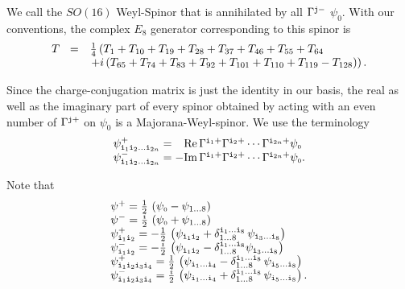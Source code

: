 \documentclass[a4paper,12pt]{article}
\begin{document}
We call the $SO(16)$ Weyl-Spinor that is annihilated by all
$\Gamma^{{\tt j}-}$ $\psi_{\scriptscriptstyle 0}$. With our conventions, the complex
$E_8$ generator corresponding to this spinor is
\begin{equation}
\begin{array}{lcl}
T_{\scriptscriptstyle}&=&\frac{1}{4}\left(T_{1}+T_{10}+T_{19}+T_{28}+T_{37}+T_{46}+T_{55}+T_{64}\right.\\
&&\left.+i\left(T_{65}+T_{74}+T_{83}+T_{92}+T_{101}+T_{110}+T_{119}-T_{128}\right)\right).
\end{array}
\end{equation}


Since the charge-conjugation matrix is just the identity in our basis,
the real as well as the imaginary part of every spinor obtained by
acting with an even number of $\Gamma^{{\tt j}+}$ on
$\psi_{\scriptscriptstyle 0}$ is a Majorana-Weyl-spinor.
We use the terminology
\begin{equation}
\begin{array}{l}
\psip{{\tt i}_1 {\tt i}_2\ldots {\tt i}_{2n}}=\phantom+\mbox{Re}\,\Gamma^{{\tt i}_1+}\Gamma^{{\tt i}_2+}\cdots\Gamma^{{\tt i}_{2n}+}\psi_{\scriptscriptstyle 0}\\
\psim{{\tt i}_1 {\tt i}_2\ldots {\tt i}_{2n}}=-\mbox{Im}\,\Gamma^{{\tt i}_1+}\Gamma^{{\tt i}_2+}\cdots\Gamma^{{\tt i}_{2n}+}\psi_{\scriptscriptstyle 0}.
\end{array}
\end{equation}

Note that
\begin{equation}
\begin{array}{l}
\psi^+_{}=\frac{1}{2}\,\left(\psi_{\scriptscriptstyle 0}-\psi_{1\ldots8}\right)\\
\psi^-_{}=\frac{i}{2}\,\left(\psi_{\scriptscriptstyle 0}+\psi_{1\ldots8}\right)\\
\psi^+_{{\tt i}_1 {\tt i}_2}=-\frac{1}{2}\,\left(\psi_{{\tt i}_1 {\tt i}_2}+\delta^{{\tt i}_1\ldots {\tt i}_8}_{1\ldots8}\,\psi_{{\tt i}_3\ldots {\tt i}_8}\right)\\
\psi^-_{{\tt i}_1 {\tt i}_2}=-\frac{i}{2}\,\left(\psi_{{\tt i}_1 {\tt i}_2}-\delta^{{\tt i}_1\ldots {\tt i}_8}_{1\ldots8}\psi_{{\tt i}_3\ldots {\tt i}_8}\right)\\
\psi^+_{{\tt i}_1 {\tt i}_2 {\tt i}_3 {\tt i}_4}=\frac{1}{2}\,\left(\psi_{{\tt i}_1\ldots {\tt i}_4}-\delta^{{\tt i}_1\ldots {\tt i}_8}_{1\ldots8}\,\psi_{{\tt i}_5\ldots {\tt i}_8}\right)\\
\psi^-_{{\tt i}_1 {\tt i}_2 {\tt i}_3 {\tt i}_4}=\frac{i}{2}\,\left(\psi_{{\tt i}_1\ldots {\tt i}_4}+\delta^{{\tt i}_1\ldots {\tt i}_8}_{1\ldots8}\,\psi_{{\tt i}_5\ldots {\tt i}_8}\right).
\end{array}
\end{equation}
\end{document}
